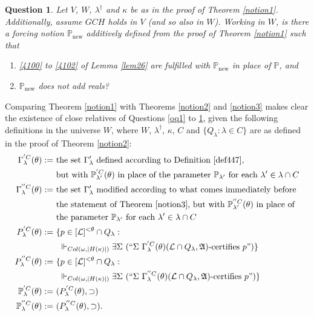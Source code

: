 \documentclass[12pt, twoside]{memoir}
\numberwithin{equation}{section}
\newtheorem{ques}[thm]{Question}
\theoremstyle{definition}
\theoremstyle{remark}
\theoremstyle{definition}
\theoremstyle{definition}
\theoremstyle{definition}
\theoremstyle{remark}
\begin{document}
\begin{ques}\label{addsrealsadd}
Let $V$, $W$, $\lambda^{\dagger}$ and $\kappa$ be as in the proof of Theorem \ref{notion1}. Additionally, assume $GCH$ holds in $V$ (and so also in $W$). Working in $W$, is there a forcing notion $\mathbb{P}_{\mathrm{new}}$ additively defined from the proof of Theorem \ref{notion1} such that
\begin{enumerate}[label=(\arabic*)]
    \item \ref{4100} to \ref{4102} of Lemma \ref{lem26} are fulfilled with $\mathbb{P}_{\mathrm{new}}$ in place of $\mathbb{P}$, and
    \item $\mathbb{P}_{\mathrm{new}}$ does not add reals?
\end{enumerate}
\end{ques}

Comparing Theorem \ref{notion1} with Theorems \ref{notion2} and \ref{notion3} makes clear the existence of close relatives of Questions \ref{oq1} to \ref{addsrealsadd}, given the following definitions in the universe $W$, where $W$, $\lambda^{\dagger}$, $\kappa$, $C$ and $\{Q_{\lambda} : \lambda \in C\}$ are as defined in the proof of Theorem \ref{notion2}:
\begin{align*}
    \Gamma^{'C}_{\lambda}(\theta) := \ & \text{the set } \Gamma'_{\lambda} \text{ defined according to Definition \ref{def447},} \\
    & \text{but with } \mathbb{P}^{'C}_{\lambda'}(\theta) \text{ in place of the parameter } \mathbb{P}_{\lambda'} \text{ for each } \lambda' \in \lambda \cap C \\
    \Gamma^{''C}_{\lambda}(\theta) := \ & \text{the set } \Gamma'_{\lambda} \text{ modified according to what comes immediately before}
    \\
    & \text{the statement of Theorem \ref{notion3}, but with } \mathbb{P}^{''C}_{\lambda'}(\theta) \text{ in place of } \\
    & \text{the parameter } \mathbb{P}_{\lambda'} \text{ for each } \lambda' \in \lambda \cap C \\
    P^{'C}_{\lambda}(\theta) := \ & \{p \in [\mathcal{L}]^{< \theta} \cap Q_{\lambda} : \\
    & \ \Vdash_{Col(\omega, |H(\kappa)|)} \exists \Sigma \ (``\Sigma \ \Gamma^{'C}_{\lambda}(\theta) (\mathcal{L} \cap Q_{\lambda}, \mathfrak{A}) \text{-certifies } p")\} \\
    P^{''C}_{\lambda}(\theta) := \ & \{p \in [\mathcal{L}]^{< \theta} \cap Q_{\lambda} : \\
    & \ \Vdash_{Col(\omega, |H(\kappa)|)} \exists \Sigma \ (``\Sigma \ \Gamma^{''C}_{\lambda}(\theta) (\mathcal{L} \cap Q_{\lambda}, \mathfrak{A}) \text{-certifies } p")\} \\
    \mathbb{P}^{'C}_{\lambda}(\theta) := \ & (P^{'C}_{\lambda}(\theta), \supset) \\
    \mathbb{P}^{''C}_{\lambda}(\theta) := \ & (P^{''C}_{\lambda}(\theta), \supset) \text{.}
\end{align*}
\end{document}
